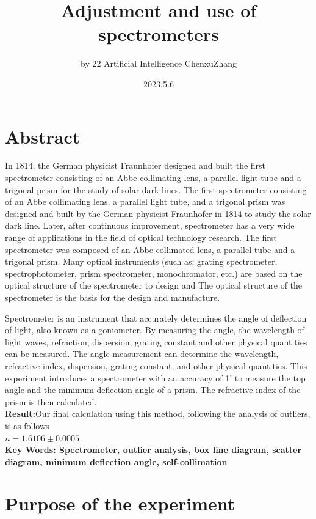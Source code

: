 \documentclass[UTF8]{article}
\title{Adjustment and use of spectrometers}
\author{by 22 Artificial Intelligence ChenxuZhang}
\date{2023.5.6}
\begin{document}
	
	\fancyfoot[C]{\thepage}
	
	\maketitle
	\tableofcontents
	\newpage
	
	\section{Abstract}
In 1814, the German physicist Fraunhofer designed and built the first spectrometer consisting of an Abbe collimating lens, a parallel light tube and a trigonal prism for the study of solar dark lines. The first spectrometer consisting of an Abbe collimating lens, a parallel light tube, and a trigonal prism was designed and built by the German physicist Fraunhofer in 1814 to study the solar dark line. Later, after continuous improvement, spectrometer has a very wide range of applications in the field of optical technology research. The first spectrometer was composed of an Abbe collimated lens, a parallel tube and a trigonal prism. Many optical instruments (such as: grating spectrometer, spectrophotometer, prism spectrometer, monochromator, etc.) are based on the optical structure of the spectrometer to design and The optical structure of the spectrometer is the basis for the design and manufacture.

Spectrometer is an instrument that accurately determines the angle of deflection of light, also known as a goniometer. By measuring the angle, the wavelength of light waves, refraction, dispersion, grating constant and other physical quantities can be measured. The angle measurement can determine the wavelength, refractive index, dispersion, grating constant, and other physical quantities. This experiment introduces a spectrometer with an accuracy of 1' to measure the top angle and the minimum deflection angle of a prism. The refractive index of the prism is then calculated.\\
	\textbf{Result:}Our final calculation using this method, following the analysis of outliers, is as follows \\$n = 1.6106\pm 0.0005$\\
	\textbf{Key Words: Spectrometer, outlier analysis, box line diagram, scatter diagram, minimum deflection angle, self-collimation}
	
	
	\section{Purpose of the experiment}
\end{document}
